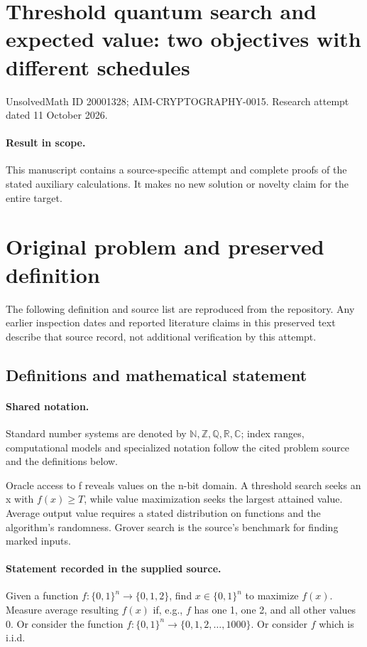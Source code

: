\documentclass[11pt]{article}
\begin{document}
\section*{Threshold quantum search and expected value: two objectives with different schedules}
\noindent UnsolvedMath ID 20001328; AIM-CRYPTOGRAPHY-0015. Research attempt dated 11 October 2026.
\paragraph{Result in scope.}This manuscript contains a source-specific attempt and complete proofs of the stated auxiliary calculations. It makes no new solution or novelty claim for the entire target.
\section{Original problem and preserved definition}
The following definition and source list are reproduced from the repository. Any earlier inspection dates and reported literature claims in this preserved text describe that source record, not additional verification by this attempt.
\subsection{Definitions and mathematical statement}

\paragraph{Shared notation.}Standard number systems are denoted by $\mathbb N,\mathbb Z,\mathbb Q,\mathbb R,\mathbb C$; index ranges, computational models and specialized notation follow the cited problem source and the definitions below.


Oracle access to f reveals values on the n-bit domain. A threshold search seeks an x with $f(x)\ge T$, while value maximization seeks the largest attained value. Average output value requires a stated distribution on functions and the algorithm's randomness. Grover search is the source's benchmark for finding marked inputs.
\paragraph{Statement recorded in the supplied source.}
Given a function $f:\{0,1\}^n \to \{0,1,2\}$, find $x\in \{0,1\}^n$ to maximize $f(x)$. Measure average resulting $f(x)$ if, e.g., $f$ has one 1, one 2, and all other values 0. Or consider the function $f:\{0,1\}^n \to \{0,1,2, \dots, 1000\}$. Or consider $f$ which is i.i.d.
\end{document}
